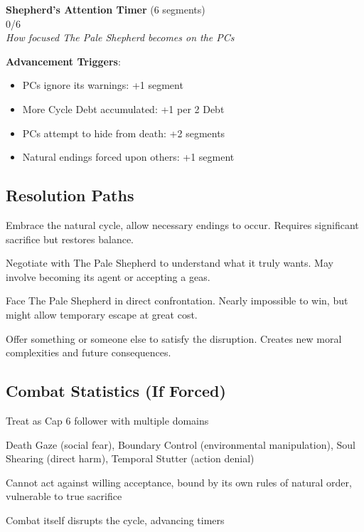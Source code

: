 \documentclass[11pt]{article}
\newcommand{\timersegment}{\textbullet}
\begin{document}
\begin{center}
\textbf{Shepherd's Attention Timer } (6 segments)\\
\fbox{\timersegment\timersegment\timersegment\timersegment\timersegment\timersegment} 0/6\\
\textit{How focused The Pale Shepherd becomes on the PCs}
\end{center}

\textbf{Advancement Triggers}:
\begin{itemize}[leftmargin=*]
\item PCs ignore its warnings: +1 segment
\item More Cycle Debt accumulated: +1 per 2 Debt
\item PCs attempt to hide from death: +2 segments
\item Natural endings forced upon others: +1 segment
\end{itemize}

\subsection*{Resolution Paths}

\begin{description}[leftmargin=*]
\item[Acceptance] Embrace the natural cycle, allow necessary endings to occur. Requires significant sacrifice but restores balance.
\item[The Bargain] Negotiate with The Pale Shepherd to understand what it truly wants. May involve becoming its agent or accepting a geas.
\item[The Reckoning] Face The Pale Shepherd in direct confrontation. Nearly impossible to win, but might allow temporary escape at great cost.
\item[The Substitute] Offer something or someone else to satisfy the disruption. Creates new moral complexities and future consequences.
\end{description}

\subsection*{Combat Statistics (If Forced)}

\begin{description}[leftmargin=*]
\item[Scale] Treat as Cap 6 follower with multiple domains
\item[Abilities] Death Gaze (social fear), Boundary Control (environmental manipulation), Soul Shearing (direct harm), Temporal Stutter (action denial)
\item[Weaknesses] Cannot act against willing acceptance, bound by its own rules of natural order, vulnerable to true sacrifice
\item[Consequences] Combat itself disrupts the cycle, advancing timers
\end{description}
\end{document}
